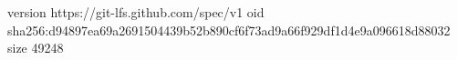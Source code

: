 version https://git-lfs.github.com/spec/v1
oid sha256:d94897ea69a2691504439b52b890cf6f73ad9a66f929df1d4e9a096618d88032
size 49248
